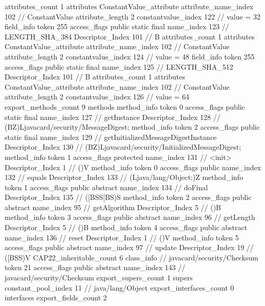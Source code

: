 {{{{{				attributes_count	1
				attributes {
				ConstantValue_attribute {
					attribute_name_index	102		// ConstantValue
					attribute_length	2
					constantvalue_index	122		// value = 32
				}
				}
			}
			field_info {
				token	255
				access_flags	public static final
				name_index	123		// LENGTH_SHA_384
				Descriptor_Index	101		// B
				attributes_count	1
				attributes {
				ConstantValue_attribute {
					attribute_name_index	102		// ConstantValue
					attribute_length	2
					constantvalue_index	124		// value = 48
				}
				}
			}
			field_info {
				token	255
				access_flags	public static final
				name_index	125		// LENGTH_SHA_512
				Descriptor_Index	101		// B
				attributes_count	1
				attributes {
				ConstantValue_attribute {
					attribute_name_index	102		// ConstantValue
					attribute_length	2
					constantvalue_index	126		// value = 64
				}
				}
			}
			}
			export_methods_count	9
			methods {
				method_info {
					token	0
					access_flags	public static final
					name_index	127		// getInstance
					Descriptor_Index	128		// (BZ)Ljavacard/security/MessageDigest;
				}
				method_info {
					token	2
					access_flags	public static final
					name_index	129		// getInitializedMessageDigestInstance
					Descriptor_Index	130		// (BZ)Ljavacard/security/InitializedMessageDigest;
				}
				method_info {
					token	1
					access_flags	protected
					name_index	131		// <init>
					Descriptor_Index	1		// ()V
				}
				method_info {
					token	0
					access_flags	public
					name_index	132		// equals
					Descriptor_Index	133		// (Ljava/lang/Object;)Z
				}
				method_info {
					token	1
					access_flags	public abstract
					name_index	134		// doFinal
					Descriptor_Index	135		// ([BSS[BS)S
				}
				method_info {
					token	2
					access_flags	public abstract
					name_index	95		// getAlgorithm
					Descriptor_Index	5		// ()B
				}
				method_info {
					token	3
					access_flags	public abstract
					name_index	96		// getLength
					Descriptor_Index	5		// ()B
				}
				method_info {
					token	4
					access_flags	public abstract
					name_index	136		// reset
					Descriptor_Index	1		// ()V
				}
				method_info {
					token	5
					access_flags	public abstract
					name_index	97		// update
					Descriptor_Index	19		// ([BSS)V
				}
			}
			CAP22_inheritable_count	6
		}
		class_info {		// javacard/security/Checksum
			token	21
			access_flags	public abstract
			name_index	143		// javacard/security/Checksum
			export_supers_count	1
			supers {
				constant_pool_index	11		// java/lang/Object
			}
			export_interfaces_count	0
			interfaces {
			}
			export_fields_count	2
}}}
